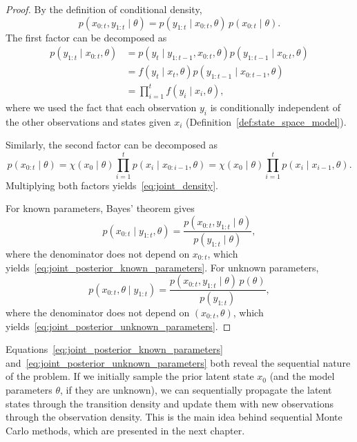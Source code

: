 \begin{proof}
    By the definition of conditional density,
    \begin{equation}
        p(x_{0:t}, y_{1:t} \mid \theta) = p(y_{1:t} \mid x_{0:t}, \theta)\, p(x_{0:t} \mid \theta).
    \end{equation}
    The first factor can be decomposed as
    \begin{align}
        p(y_{1:t} \mid x_{0:t}, \theta) &= p(y_t \mid y_{1:t-1}, x_{0:t}, \theta) p(y_{1:t-1} \mid x_{0:t}, \theta) \\
        &= f(y_t \mid x_t, \theta) p(y_{1:t-1} \mid x_{0:t-1}, \theta) \\
        &= \prod_{i=1}^{t} f(y_i \mid x_i, \theta),
    \end{align}
    where we used the fact that each observation $y_i$ is conditionally independent of the other observations and states given $x_i$ (Definition~\ref{def:state_space_model}).

    Similarly, the second factor can be decomposed as
    \begin{equation}
        p(x_{0:t} \mid \theta) = \chi(x_0 \mid \theta) \prod_{i=1}^{t} p(x_i \mid x_{0:i-1}, \theta) = \chi(x_0 \mid \theta) \prod_{i=1}^{t} p(x_i \mid x_{i-1}, \theta).
    \end{equation}
    Multiplying both factors yields~\eqref{eq:joint_density}.

    For known parameters, Bayes' theorem gives
    \begin{equation}
        p(x_{0:t} \mid y_{1:t}, \theta) = \frac{p(x_{0:t}, y_{1:t} \mid \theta)}{p(y_{1:t} \mid \theta)},
    \end{equation}
    where the denominator does not depend on $x_{0:t}$, which yields~\eqref{eq:joint_posterior_known_parameters}. For unknown parameters,
    \begin{equation}
        p(x_{0:t}, \theta \mid y_{1:t}) = \frac{p(x_{0:t}, y_{1:t} \mid \theta)\, p(\theta)}{p(y_{1:t})},
    \end{equation}
    where the denominator does not depend on $(x_{0:t}, \theta)$, which yields~\eqref{eq:joint_posterior_unknown_parameters}.
\end{proof}

Equations~\eqref{eq:joint_posterior_known_parameters} and~\eqref{eq:joint_posterior_unknown_parameters} both reveal the sequential nature of the problem. If we initially sample the prior latent state $x_0$ (and the model parameters $\theta$, if they are unknown), we can sequentially propagate the latent states through the transition density and update them with new observations through the observation density. This is the main idea behind sequential Monte Carlo methods, which are presented in the next chapter.

